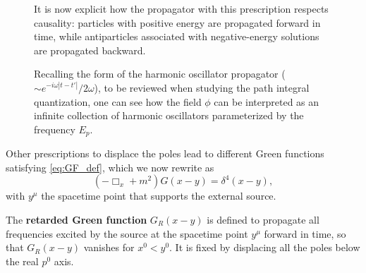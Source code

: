 \begin{figure}[H]
    \begin{minipage}{0.6\textwidth}
        It is now explicit how the propagator with this prescription respects causality: particles with positive energy are propagated forward in time, while antiparticles associated with negative-energy solutions are propagated backward.

        Recalling the form of the harmonic oscillator propagator ($\sim e^{-i\omega |t - t'|}/2\omega$), to be reviewed when studying the path integral quantization, one can see how the field $\phi$ can be interpreted as an infinite collection of harmonic oscillators parameterized by the frequency $E_p$.
    \end{minipage}
    \hfill
    \begin{minipage}{0.35\textwidth}
        \centering
    \end{minipage}
\end{figure}

Other prescriptions to displace the poles lead to different Green functions satisfying \eqref{eq:GF_def}, which we now rewrite as
\[
    (-\Box_x + m^2) G(x - y) = \delta^4(x - y),
\]
with $y^\mu$ the spacetime point that supports the external source.

The \textbf{retarded Green function} $G_R(x - y)$ is defined to propagate all frequencies excited by the source at the spacetime point $y^\mu$ forward in time, so that $G_R(x - y)$ vanishes for $x^0 < y^0$. It is fixed by displacing all the poles below the real $p^0$ axis.

